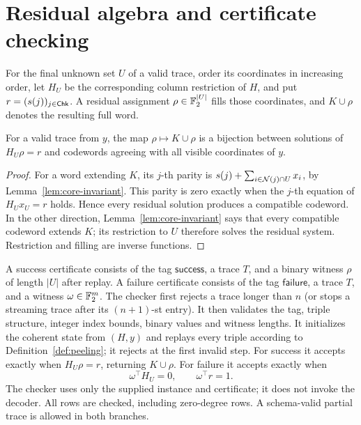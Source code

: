 \section{Residual algebra and certificate checking}\label{sec:certificates}
For the final unknown set $U$ of a valid trace, order its coordinates
in increasing order, let $H_U$ be the corresponding column restriction
of $H$, and put $r=(s(j))_{j\in\mathsf{Chk}}$. A residual assignment
$\rho\in\mathbb{F}_2^{|U|}$ fills those coordinates, and $K\cup\rho$ denotes
the resulting full word.

\begin{lem}\label{lem:core-residual}
For a valid trace from $y$, the map $\rho\mapsto K\cup\rho$ is a
bijection between solutions of $H_U\rho=r$ and codewords agreeing with
all visible coordinates of $y$.
\end{lem}
\begin{proof}
For a word extending $K$, its $j$-th parity is
$s(j)+\sum_{i\in\mathcal{N}(j)\cap U}x_i$, by
Lemma~\ref{lem:core-invariant}. This parity is zero exactly when the
$j$-th equation of $H_Ux_U=r$ holds. Hence every residual solution
produces a compatible codeword. In the other direction,
Lemma~\ref{lem:core-invariant} says that every compatible codeword
extends $K$; its restriction to $U$ therefore solves the residual
system. Restriction and filling are inverse functions.
\end{proof}

\begin{defi}\label{def:certificates}
A success certificate consists of the tag $\mathsf{success}$, a trace
$T$, and a binary witness $\rho$ of length $|U|$ after replay. A failure
certificate consists of the tag $\mathsf{failure}$, a trace $T$, and a
witness $\omega\in\mathbb{F}_2^m$.
The checker first rejects a trace longer than $n$ (or stops a streaming
trace after its $(n+1)$-st entry). It then validates the tag, triple
structure, integer index bounds, binary values and witness lengths. It initializes the coherent
state from $(H,y)$ and replays every triple according to
Definition~\ref{def:peeling}; it rejects at the first invalid step.
For success it accepts exactly when $H_U\rho=r$, returning $K\cup\rho$.
For failure it accepts exactly when
\begin{equation}\label{eq:separator}
 \omega^\top H_U=0,\qquad \omega^\top r=1.
\end{equation}
The checker uses only the supplied instance and certificate; it does
not invoke the decoder. All rows are checked, including zero-degree
rows. A schema-valid partial trace is allowed in both branches.
\end{defi}


